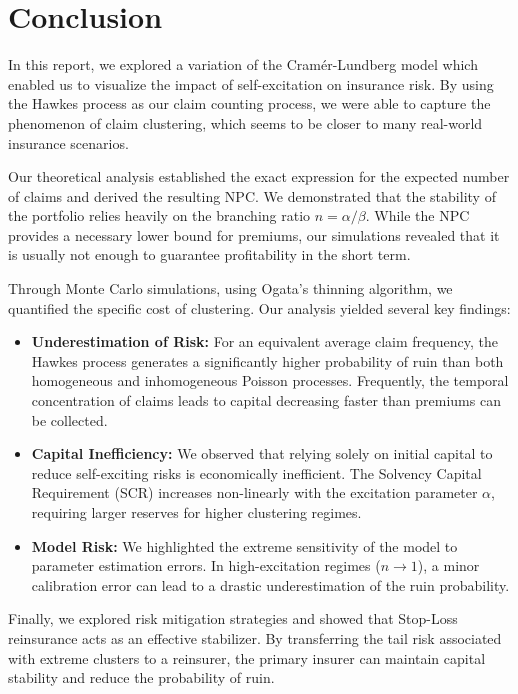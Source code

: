 \documentclass[a4paper,11pt]{article}
\begin{document}
\clearpage
\section*{Conclusion}

In this report, we explored a variation of the Cramér-Lundberg model which enabled us to visualize the impact of self-excitation on insurance risk. By using the Hawkes process as our claim counting process, we were able to capture the phenomenon of claim clustering, which seems to be closer to many real-world insurance scenarios.

Our theoretical analysis established the exact expression for the expected number of claims and derived the resulting NPC. We demonstrated that the stability of the portfolio relies heavily on the branching ratio $n = \alpha / \beta$. While the NPC provides a necessary lower bound for premiums, our simulations revealed that it is usually not enough to guarantee profitability in the short term.

Through Monte Carlo simulations, using Ogata’s thinning algorithm, we quantified the specific cost of clustering. Our analysis yielded several key findings:
\begin{itemize}
    \item \textbf{Underestimation of Risk:} For an equivalent average claim frequency, the Hawkes process generates a significantly higher probability of ruin than both homogeneous and inhomogeneous Poisson processes. Frequently, the temporal concentration of claims leads to capital decreasing faster than premiums can be collected.
    \item \textbf{Capital Inefficiency:} We observed that relying solely on initial capital to reduce self-exciting risks is economically inefficient. The Solvency Capital Requirement (SCR) increases non-linearly with the excitation parameter $\alpha$, requiring larger reserves for higher clustering regimes.
    \item \textbf{Model Risk:} We highlighted the extreme sensitivity of the model to parameter estimation errors. In high-excitation regimes ($n \to 1$), a minor calibration error can lead to a drastic underestimation of the ruin probability.
\end{itemize}

Finally, we explored risk mitigation strategies and showed that Stop-Loss reinsurance acts as an effective stabilizer. By transferring the tail risk associated with extreme clusters to a reinsurer, the primary insurer can maintain capital stability and reduce the probability of ruin.
\end{document}
